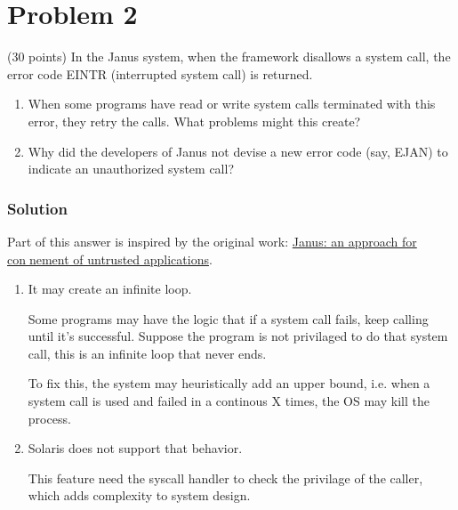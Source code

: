 \section*{Problem 2}

(30 points) In the Janus system, when the framework disallows a system call, the error code EINTR (interrupted system call) is returned.

\begin{enumerate}
    \item When some programs have read or write system calls terminated with this error, they retry the calls. 
    What problems might this create?
    \item Why did the developers of Janus not devise a new error code (say, EJAN) to indicate an unauthorized system call?    
\end{enumerate}

\subsubsection*{Solution}

Part of this answer is inspired by the original work: \href{https://www2.eecs.berkeley.edu/Pubs/TechRpts/1999/CSD-99-1056.pdf}{Janus: an approach for connement of untrusted applications}.

\begin{enumerate}
    \item It may create an infinite loop.
    
    Some programs may have the logic that if a system call fails, keep calling until it's successful.
    Suppose the program is not privilaged to do that system call, this is an infinite loop that never ends.

    To fix this, the system may heuristically add an upper bound, i.e. when a system call is used and failed in a continous X times, the OS may kill the process.

    \item Solaris does not support that behavior.
    
    This feature need the syscall handler to check the privilage of the caller, which adds complexity to system design.
\end{enumerate}